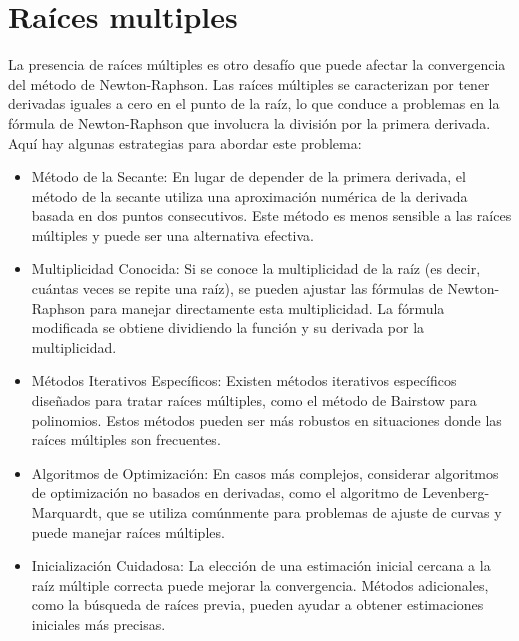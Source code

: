 \documentclass[conference]{IEEEtran}
\begin{document}
\section{Raíces multiples}

La presencia de raíces múltiples es otro desafío que puede afectar la
convergencia del método de Newton-Raphson. Las raíces múltiples se
caracterizan por tener derivadas iguales a cero en el punto de la raíz, lo que
conduce a problemas en la fórmula de Newton-Raphson que involucra la
división por la primera derivada. Aquí hay algunas estrategias para
abordar este problema:

\begin{itemize}
	\item Método de la Secante: En lugar de depender de la primera derivada,
	      el método de la secante utiliza una aproximación numérica de la derivada
	      basada en dos puntos consecutivos. Este método es menos sensible a las
	      raíces múltiples y puede ser una alternativa efectiva.

	\item Multiplicidad Conocida:
	      Si se conoce la multiplicidad de la raíz (es decir, cuántas veces
	      se repite una raíz), se pueden ajustar las fórmulas de Newton-Raphson
	      para manejar directamente esta multiplicidad. La fórmula
	      modificada se obtiene dividiendo la función y su derivada
	      por la multiplicidad.

	\item Métodos Iterativos Específicos:
	      Existen métodos iterativos específicos diseñados para tratar
	      raíces múltiples, como el método de Bairstow para polinomios.
	      Estos métodos pueden ser más robustos en situaciones donde las
	      raíces múltiples son frecuentes.

	\item Algoritmos de Optimización:
	      En casos más complejos, considerar algoritmos de optimización no
	      basados en derivadas, como el algoritmo de Levenberg-Marquardt, que
	      se utiliza comúnmente para problemas de ajuste de curvas y puede
	      manejar raíces múltiples.

	\item Inicialización Cuidadosa:
	      La elección de una estimación inicial cercana a la raíz múltiple
	      correcta puede mejorar la convergencia. Métodos adicionales, como
	      la búsqueda de raíces previa, pueden ayudar a obtener estimaciones
	      iniciales más precisas.

\end{itemize}
\end{document}
